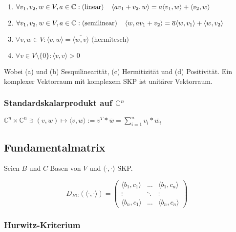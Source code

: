 \begin{enumerate}[label=(\alph*)]
	\item $\forall v_1, v_2, w \in V, a \in \mathbb{C} : \text{(linear)} \\ \hspace*{4mm} \langle av_1 + v_2, w \rangle = a \langle v_1, w \rangle + \langle v_2, w \rangle$
	\item $\forall v_1, v_2, w \in V, a \in \mathbb{C} : \text{(semilinear)} \\ \hspace*{4mm} \langle w, av_1 + v_2 \rangle = \overline a \langle w, v_1 \rangle + \langle w, v_2 \rangle$
	\item $\forall v, w \in V : \langle v, w \rangle = \overline{\langle w, v \rangle} \text{ (hermitesch)}$
	\item $\forall v \in V \setminus \{0\} : \langle v, v \rangle > 0$
\end{enumerate}

Wobei (a) und (b) Sesquilinearität, (c) Hermitizität und (d) Positivität. Ein komplexer Vektorraum mit komplexem SKP ist unitärer Vektorraum.

\subsubsection*{Standardskalarprodukt auf $\mathbb{C}^n$}

$\mathbb{C}^n \times \mathbb{C}^n \ni (v, w) \mapsto \langle v, w \rangle := v^T * \overline w = \sum_{i=1}^n v_i * \overline{w_i}$

\subsection*{Fundamentalmatrix}

Seien $B$ und $C$ Basen von $V$ und $\langle \cdot, \cdot \rangle$ SKP.

\vspace*{-3mm}
\[ D_{BC}(\langle \cdot, \cdot \rangle) = \begin{pmatrix}
	\langle b_1, c_1 \rangle & \hdots & \langle b_1, c_n \rangle \\
	\vdots & \ddots & \vdots \\
	\langle b_n, c_1 \rangle & \hdots & \langle b_n, c_n \rangle
\end{pmatrix} \]

\subsubsection*{Hurwitz-Kriterium}

